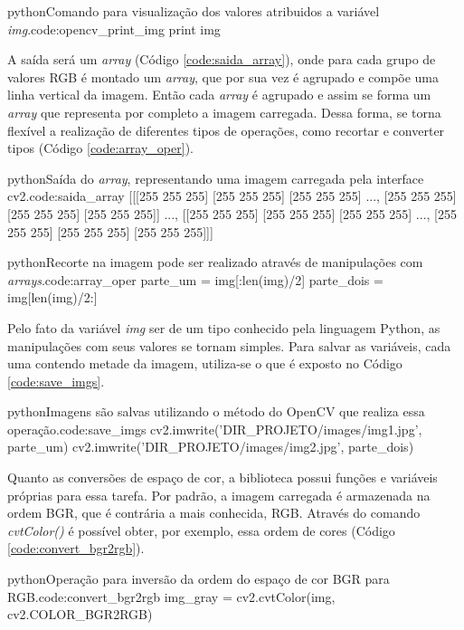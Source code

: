 \begin{code}{python}{Comando para visualização dos valores atribuidos a variável \textit{img}.}{code:opencv_print_img}
print img
\end{code}

A saída será um \textit{array} (Código \ref{code:saida_array}), onde para cada grupo de valores RGB é montado um \textit{array}, que por sua vez é agrupado e compõe uma linha vertical da imagem. Então cada \textit{array} é agrupado e assim se forma um \textit{array} que representa por completo a imagem carregada. Dessa forma, se torna flexível a realização de diferentes tipos de operações, como recortar e converter tipos (Código \ref{code:array_oper}).

\begin{code}{python}{Saída do \textit{array}, representando uma imagem carregada pela interface cv2.}{code:saida_array}
[[[255 255 255]
  [255 255 255]
  [255 255 255]
  ...,
  [255 255 255]
  [255 255 255]
  [255 255 255]]
 ...,
 [[255 255 255]
  [255 255 255]
  [255 255 255]
  ...,
  [255 255 255]
  [255 255 255]
  [255 255 255]]]
\end{code}

\begin{code}{python}{Recorte na imagem pode ser realizado através de manipulações com \textit{arrays}.}{code:array_oper}
parte_um = img[:len(img)/2]
parte_dois = img[len(img)/2:]
\end{code}

Pelo fato da variável \textit{img} ser de um tipo conhecido pela linguagem Python, as manipulações com seus valores se tornam simples. Para salvar as variáveis, cada uma contendo metade da imagem, utiliza-se o que é exposto no Código \ref{code:save_imgs}.

\begin{code}{python}{Imagens são salvas utilizando o método do OpenCV que realiza essa operação.}{code:save_imgs}
cv2.imwrite('DIR_PROJETO/images/img1.jpg', parte_um)
cv2.imwrite('DIR_PROJETO/images/img2.jpg', parte_dois)
\end{code}

Quanto as conversões de espaço de cor, a biblioteca possui funções e variáveis próprias para essa tarefa. Por padrão, a imagem carregada é armazenada na ordem BGR, que é contrária a mais conhecida, RGB. Através do comando \textit{cvtColor()} é possível obter, por exemplo, essa ordem de cores (Código \ref{code:convert_bgr2rgb}).

\begin{code}{python}{Operação para inversão da ordem do espaço de cor BGR para RGB.}{code:convert_bgr2rgb}
img_gray = cv2.cvtColor(img, cv2.COLOR_BGR2RGB)
\end{code}

